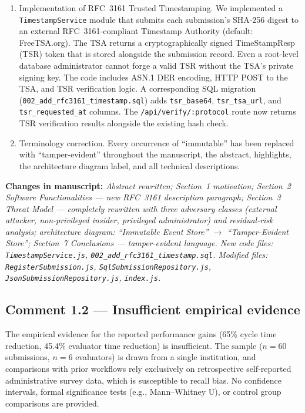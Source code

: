 \documentclass[11pt,a4paper]{article}
\newcommand{\change}[1]{\par\noindent\textcolor{changecolor}{\textbf{Changes in manuscript:}} \textit{#1}}
\begin{document}
\begin{enumerate}[nosep]
  \item Implementation of RFC~3161 Trusted Timestamping. We implemented a \texttt{TimestampService} module that submits each submission's SHA-256 digest to an external RFC~3161-compliant Timestamp Authority (default: FreeTSA.org). The TSA returns a cryptographically signed TimeStampResp (TSR) token that is stored alongside the submission record. Even a root-level database administrator cannot forge a valid TSR without the TSA's private signing key. The code includes ASN.1 DER encoding, HTTP POST to the TSA, and TSR verification logic. A corresponding SQL migration (\texttt{002\_add\_rfc3161\_timestamp.sql}) adds \texttt{tsr\_base64}, \texttt{tsr\_tsa\_url}, and \texttt{tsr\_requested\_at} columns. The \texttt{/api/verify/:protocol} route now returns TSR verification results alongside the existing hash check.

  \item Terminology correction. Every occurrence of ``immutable'' has been replaced with ``tamper-evident'' throughout the manuscript, the abstract, highlights, the architecture diagram label, and all technical descriptions.
\end{enumerate}

\change{%
Abstract rewritten; Section~1 motivation; Section~2 Software Functionalities --- new RFC~3161 description paragraph; Section~3 Threat Model --- completely rewritten with three adversary classes (external attacker, non-privileged insider, privileged administrator) and residual-risk analysis; architecture diagram: ``Immutable Event Store'' $\to$ ``Tamper-Evident Store''; Section~7 Conclusions --- tamper-evident language. New code files: \texttt{TimestampService.js}, \texttt{002\_add\_rfc3161\_timestamp.sql}. Modified files: \texttt{RegisterSubmission.js}, \texttt{SqlSubmissionRepository.js}, \texttt{JsonSubmissionRepository.js}, \texttt{index.js}.}

\bigskip

\subsection*{Comment 1.2 --- Insufficient empirical evidence}

\begin{reviewerbox}
The empirical evidence for the reported performance gains (65\% cycle time reduction, 45.4\% evaluator time reduction) is insufficient. The sample ($n=60$ submissions, $n=6$ evaluators) is drawn from a single institution, and comparisons with prior workflows rely exclusively on retrospective self-reported administrative survey data, which is susceptible to recall bias. No confidence intervals, formal significance tests (e.g., Mann--Whitney U), or control group comparisons are provided.
\end{reviewerbox}
\end{document}
